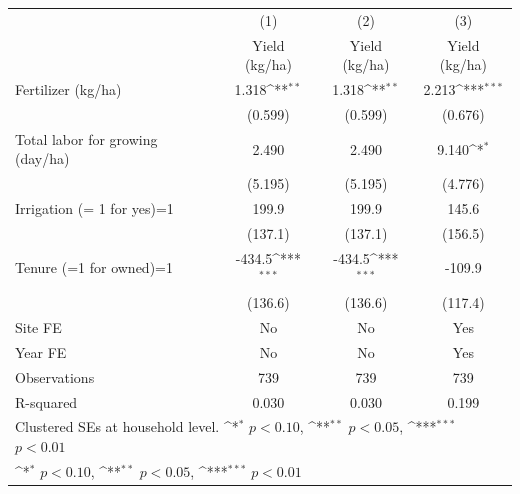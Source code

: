 {
\def\sym#1{\ifmmode^{#1}\else\(^{#1}\)\fi}
\begin{tabular}{l*{3}{c}}
\toprule
                    &\multicolumn{1}{c}{(1)}&\multicolumn{1}{c}{(2)}&\multicolumn{1}{c}{(3)}\\
                    &\multicolumn{1}{c}{Yield (kg/ha)}&\multicolumn{1}{c}{Yield (kg/ha)}&\multicolumn{1}{c}{Yield (kg/ha)}\\
\midrule
Fertilizer (kg/ha)  &       1.318\sym{**} &       1.318\sym{**} &       2.213\sym{***}\\
                    &     (0.599)         &     (0.599)         &     (0.676)         \\
\addlinespace
Total labor for growing (day/ha)&       2.490         &       2.490         &       9.140\sym{*}  \\
                    &     (5.195)         &     (5.195)         &     (4.776)         \\
\addlinespace
Irrigation (= 1 for yes)=1&       199.9         &       199.9         &       145.6         \\
                    &     (137.1)         &     (137.1)         &     (156.5)         \\
\addlinespace
Tenure (=1 for owned)=1&      -434.5\sym{***}&      -434.5\sym{***}&      -109.9         \\
                    &     (136.6)         &     (136.6)         &     (117.4)         \\
\addlinespace
Site FE             &          No         &          No         &         Yes         \\
\addlinespace
Year FE             &          No         &          No         &         Yes         \\
\midrule
Observations        &         739         &         739         &         739         \\
R-squared           &       0.030         &       0.030         &       0.199         \\
\bottomrule
\multicolumn{4}{l}{\footnotesize Clustered SEs at household level. \sym{*} \(p<0.10\), \sym{**} \(p<0.05\),  \sym{***} \(p<0.01\)}\\
\multicolumn{4}{l}{\footnotesize \sym{*} \(p<0.10\), \sym{**} \(p<0.05\), \sym{***} \(p<0.01\)}\\
\end{tabular}
}
